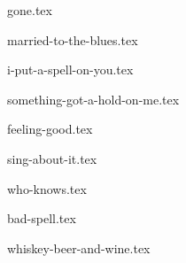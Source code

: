 \begin{songs}{}
  {gone.tex}
  \sclearpage

  {married-to-the-blues.tex}
  \sclearpage

  {i-put-a-spell-on-you.tex}
  \sclearpage

  {something-got-a-hold-on-me.tex}
  \sclearpage

  {feeling-good.tex}
  \sclearpage
    
  {sing-about-it.tex}
  \sclearpage
    
  {who-knows.tex}
  \sclearpage

  {bad-spell.tex}
  \sclearpage
  
  {whiskey-beer-and-wine.tex}
  \sclearpage

 \end{songs}
